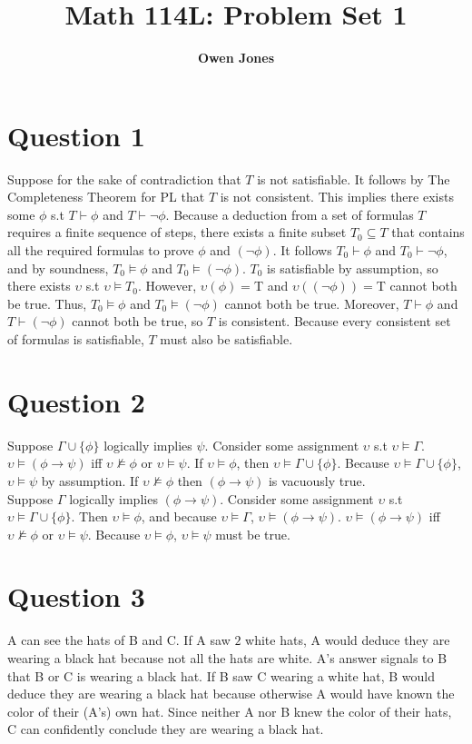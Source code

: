 \documentclass[10pt]{article}
\title{\bf Math 114L\@: Problem Set 1}
\author{\bf Owen Jones}
\begin{document}
\maketitle
\section*{Question 1}
Suppose for the sake of contradiction that $T$ is not satisfiable. 
It follows by The Completeness Theorem for PL that $T$ is not consistent. 
This implies there exists some $\phi$ s.t $T\vdash \phi$ and $T\vdash \lnot\phi$.  
Because a deduction from a set of formulas $T$ requires a finite sequence of steps, there exists a finite subset $T_0\subseteq T$ that contains all the required formulas to prove $\phi$ and $(\lnot\phi)$.
It follows $T_0\vdash \phi$ and $T_0\vdash \lnot\phi$, and by soundness, $T_0\models\phi$ and $T_0\models(\lnot\phi)$.
$T_0$ is satisfiable by assumption, so there exists $\upsilon$ s.t $\upsilon\models T_0$.
However, $\upsilon(\phi)=$T and $\upsilon((\lnot\phi))=$T cannot both be true.
Thus, $T_0\models\phi$ and $T_0\models(\lnot\phi)$ cannot both be true.
Moreover, $T\vdash \phi$ and $T\vdash (\lnot\phi)$ cannot both be true, so $T$ is consistent.
Because every consistent set of formulas is satisfiable, $T$ must also be satisfiable.
\section*{Question 2}
Suppose $\Gamma\cup\{\phi\}$ logically implies $\psi$. 
Consider some assignment $\upsilon$ s.t $\upsilon\models \Gamma$. 
$\upsilon\models(\phi\rightarrow\psi)$ iff $\upsilon\not\models\phi$ or $\upsilon\models\psi$.
If $\upsilon\models\phi$, then $\upsilon\models\Gamma\cup\{\phi\}$. Because $\upsilon\models\Gamma\cup\{\phi\}$, $\upsilon\models\psi$ by assumption.
If $\upsilon\not\models\phi$ then $(\phi\rightarrow\psi)$ is vacuously true.\\
Suppose $\Gamma$ logically implies $(\phi\rightarrow\psi)$.
Consider some assignment $\upsilon$ s.t $\upsilon\models \Gamma\cup\{\phi\}$.
Then $\upsilon\models\phi$, and because $\upsilon\models\Gamma$, $\upsilon\models(\phi\rightarrow\psi)$.
$\upsilon\models(\phi\rightarrow\psi)$ iff $\upsilon\not\models\phi$ or $\upsilon\models\psi$.
Because $\upsilon\models\phi$, $\upsilon\models\psi$ must be true.
\section*{Question 3} 
A can see the hats of B and C. 
If A saw $2$ white hats, A would deduce they are wearing a black hat because not all the hats are white.
A's answer signals to B that B or C is wearing a black hat.
If B saw C wearing a white hat, B would deduce they are wearing a black hat because otherwise A would have known the color of their (A's) own hat.
Since neither A nor B knew the color of their hats, C can confidently conclude they are wearing a black hat.
\end{document}

